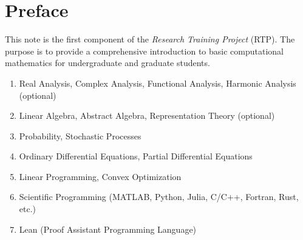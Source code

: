 \chapter*{Preface}

This note is the first component of the \emph{Research Training Project} (RTP).  The purpose is to provide a comprehensive introduction to basic computational mathematics for undergraduate and graduate students. 

\vspace{2cm}

{}

\begin{enumerate}
    \item Real Analysis, Complex Analysis, Functional Analysis, Harmonic Analysis (optional)
    \item Linear Algebra, Abstract Algebra, Representation Theory (optional) 
    \item Probability, Stochastic Processes
    \item Ordinary Differential Equations, Partial Differential Equations 
    \item Linear Programming, Convex Optimization
    \item Scientific Programming (MATLAB, Python, Julia, C/C++, Fortran, Rust, etc.)
    \item Lean (Proof Assistant Programming Language)
\end{enumerate}
